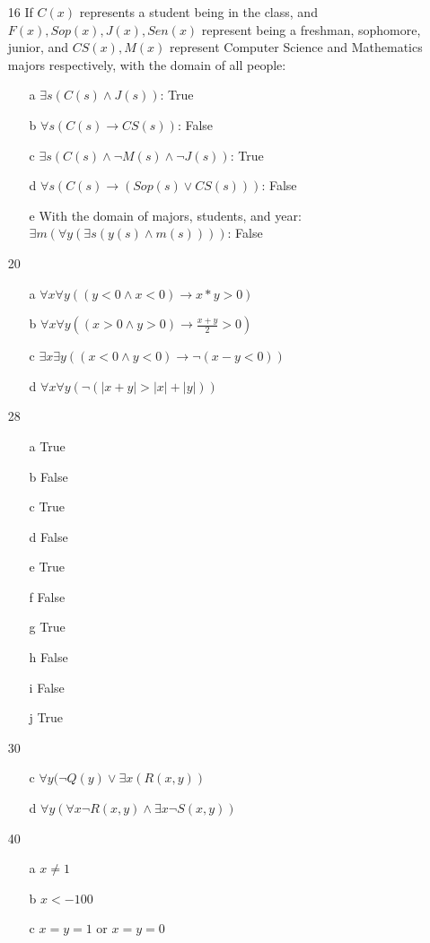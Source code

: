 \documentclass{article}
\begin{document}
\begin{itemize}
  \item[16]
    If $C(x)$ represents a student being in the class, and
    $F(x),Sop(x),J(x),Sen(x)$ represent being a freshman, sophomore, junior, and
    $CS(x),M(x)$ represent Computer Science and Mathematics majors respectively,
    with the domain of all people:
    \begin{itemize}
      \item[a] $\exists s (C(s) \land J(s))$: True
      \item[b] $\forall s (C(s) \to CS(s))$: False
      \item[c] $\exists s (C(s) \land \neg M(s) \land \neg J(s))$: True
      \item[d] $\forall s (C(s) \to (Sop(s) \lor CS(s)))$: False
      \item[e] With the domain of majors, students, and year:
        $\exists m (\forall y ( \exists s(y(s) \land m(s))))$: False
    \end{itemize}
  \item[20]
    \begin{itemize}
      \item[a] $\forall x \forall y ((y < 0 \land x < 0) \to x * y > 0)$
      \item[b] $\forall x \forall y ((x > 0 \land y > 0) \to \frac{x+y}{2}>0)$
      \item[c] $\exists x \exists y ((x < 0 \land y < 0) \to \neg (x-y < 0))$
      \item[d] $\forall x \forall y ( \neg (|x+y| > |x| + |y|))$
    \end{itemize}
  \item[28]
    \begin{itemize}
      \item[a] True
      \item[b] False
      \item[c] True
      \item[d] False
      \item[e] True
      \item[f] False
      \item[g] True
      \item[h] False
      \item[i] False
      \item[j] True
    \end{itemize}
  \item[30]
    \begin{itemize}
      \item[c] $\forall y(\neg Q(y) \lor \exists x(R(x,y))$
      \item[d] $\forall y(\forall x \neg R(x,y) \land \exists x \neg S(x,y))$
    \end{itemize}
  \item[40]
    \begin{itemize}
      \item[a] $x \neq 1$
      \item[b] $x < -100$
      \item[c] $x = y = 1$ or $x = y = 0$
    \end{itemize}
\end{itemize}
\end{document}
